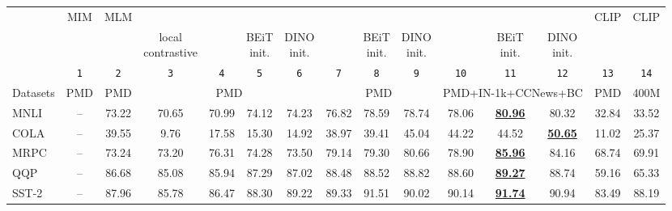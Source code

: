 \documentclass[10pt,twocolumn,letterpaper]{article}
\begin{document}
\begin{table*}[ht]
\centering
\scriptsize
\begin{tabular}{lccccccccccccc|c}
\toprule
&  \multicolumn{1}{c}{MIM} & \multicolumn{1}{c}{MLM} &
\multicolumn{4}{c}{} & \multicolumn{3}{c}{}  & \multicolumn{3}{c}{} & \multicolumn{1}{c|}{CLIP} & \multicolumn{1}{c}{CLIP} \\
\cmidrule(r){2-2}
\cmidrule(r){3-3}
\cmidrule(r){4-7}
\cmidrule(r){8-10}
\cmidrule(r){11-13}
\cmidrule(r){14-14}
\cmidrule(r){15-15}
&   &  & \shortstack{local\\contrastive} &  &  \shortstack{BEiT\\init.} & \shortstack{DINO\\init.} &  & \shortstack{BEiT\\init.} & \shortstack{DINO\\init.} & & \shortstack{BEiT\\init.} & \shortstack{DINO\\init.} & &  \\
& \small\texttt{1} & \small\texttt{2} & \small\texttt{3} & \small\texttt{4} & \small\texttt{5} & \small\texttt{6} & \small\texttt{7} & \small\texttt{8} & \small\texttt{9} & \small\texttt{10} & \small\texttt{11} & \small\texttt{12} & \small\texttt{13} & \small\texttt{14} \\
\cmidrule(r){2-2}
\cmidrule(r){3-3}
\cmidrule(r){4-7}
\cmidrule(r){8-10}
\cmidrule(r){11-13}
\cmidrule(r){14-14}
\cmidrule(r){15-15}
Datasets &  PMD & PMD & \multicolumn{4}{c}{PMD} & \multicolumn{3}{c}{PMD} & \multicolumn{3}{c}{PMD+IN-1k+CCNews+BC} & PMD & 400M\cite{radford2021learning} \\
\midrule 
MNLI & -- & 73.22 & 70.65 & 70.99 & 74.12 & 74.23 & 76.82 & 78.59 & 78.74 & 78.06 & \underline{\textbf{80.96}} & 80.32 & 32.84 & 33.52 \\
COLA & -- & 39.55 & 9.76 & 17.58 & 15.30 & 14.92 & 38.97 & 39.41 & 45.04 & 44.22 & 44.52 & \underline{\textbf{50.65}} & 11.02 & 25.37 \\
MRPC & -- & 73.24 & 73.20 & 76.31 & 74.28 & 73.50 & 79.14 & 79.30 & 80.66 & 78.90 & \underline{\textbf{85.96}} & 84.16 & 68.74 & 69.91 \\
QQP & -- & 86.68 & 85.08 & 85.94 & 87.29 & 87.02 & 88.48 & 88.52 & 88.82 & 88.60 & \underline{\textbf{89.27}} & 88.74 & 59.16 & 65.33 \\
SST-2 & -- & 87.96 & 85.78 & 86.47 & 88.30 & 89.22 & 89.33 & 91.51 & 90.02 & 90.14 & \underline{\textbf{91.74}} & 90.94 & 83.49 & 88.19 \\

\end{tabular}
\end{table*}
\end{document}
